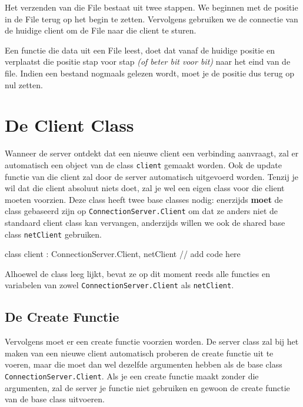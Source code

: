 Het verzenden van die File bestaat uit twee stappen. We beginnen met de positie in de File terug op het begin te zetten. Vervolgens gebruiken we de connectie van de huidige client om de File naar die client te sturen.

\begin{note}
Een functie die data uit een File leest, doet dat vanaf de huidige positie en verplaatst die positie stap voor stap \textsl{(of beter bit voor bit)} naar het eind van de file. Indien een bestand nogmaals gelezen wordt, moet je de positie dus terug op nul zetten.
\end{note}

\section{De Client Class}

Wanneer de server ontdekt dat een nieuwe client een verbinding aanvraagt, zal er automatisch een object van de class \texttt{client} gemaakt worden. Ook de update functie van die client zal door de server automatisch uitgevoerd worden. Tenzij je wil dat die client absoluut niets doet, zal je wel een eigen class voor die client moeten voorzien. Deze class heeft twee base classes nodig: enerzijds \textbf{moet} de class gebaseerd zijn op \texttt{ConnectionServer.Client} om dat ze anders niet de standaard client class kan vervangen, anderzijds willen we ook de shared base class \texttt{netClient} gebruiken.

\begin{code}
class client : ConnectionServer.Client, netClient 
{
   // add code here
}
\end{code}

\begin{note}
Alhoewel de class leeg lijkt, bevat ze op dit moment reeds alle functies en variabelen van zowel \texttt{ConnectionServer.Client} als \texttt{netClient}.
\end{note}

\subsection{De Create Functie}

Vervolgens moet er een create functie voorzien worden. De server class zal bij het maken van een nieuwe client automatisch proberen de create functie uit te voeren, maar die moet dan wel dezelfde argumenten hebben als de base class \texttt{ConnectionServer.Client}. Als je een create functie maakt zonder die argumenten, zal de server je functie niet gebruiken en gewoon de create functie van de base class uitvoeren.

